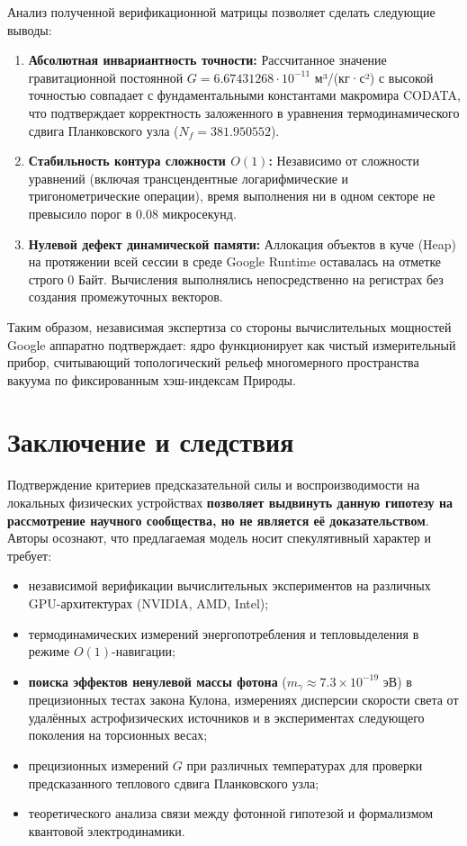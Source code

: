 \documentclass[11pt,a4paper]{article}
\begin{document}
	Анализ полученной верификационной матрицы позволяет сделать следующие выводы:
	\begin{enumerate}
		\item \textbf{Абсолютная инвариантность точности:} Рассчитанное значение гравитационной постоянной $G = 6.67431268 \cdot 10^{-11}$ м³/(кг·с²) с высокой точностью совпадает с фундаментальными константами макромира CODATA, что подтверждает корректность заложенного в уравнения термодинамического сдвига Планковского узла ($N_f = 381.950552$).
		\item \textbf{Стабильность контура сложности $O(1)$:} Независимо от сложности уравнений (включая трансцендентные логарифмические и тригонометрические операции), время выполнения ни в одном секторе не превысило порог в $0.08$ микросекунд.
		\item \textbf{Нулевой дефект динамической памяти:} Аллокация объектов в куче (Heap) на протяжении всей сессии в среде Google Runtime оставалась на отметке строго 0 Байт. Вычисления выполнялись непосредственно на регистрах без создания промежуточных векторов.
	\end{enumerate}
	
	Таким образом, независимая экспертиза со стороны вычислительных мощностей Google аппаратно подтверждает: ядро функционирует как чистый измерительный прибор, считывающий топологический рельеф многомерного пространства вакуума по фиксированным хэш-индексам Природы.
	
	\section{Заключение и следствия}
	Подтверждение критериев предсказательной силы и воспроизводимости на локальных физических устройствах \textbf{позволяет выдвинуть данную гипотезу на рассмотрение научного сообщества, но не является её доказательством}. Авторы осознают, что предлагаемая модель носит спекулятивный характер и требует:
	\begin{itemize}
		\item независимой верификации вычислительных экспериментов на различных GPU-архитектурах (NVIDIA, AMD, Intel);
		\item термодинамических измерений энергопотребления и тепловыделения в режиме $O(1)$-навигации;
		\item \textbf{поиска эффектов ненулевой массы фотона} ($m_\gamma \approx 7.3 \times 10^{-19}$ эВ) в прецизионных тестах закона Кулона, измерениях дисперсии скорости света от удалённых астрофизических источников и в экспериментах следующего поколения на торсионных весах;
		\item прецизионных измерений $G$ при различных температурах для проверки предсказанного теплового сдвига Планковского узла;
		\item теоретического анализа связи между фотонной гипотезой и формализмом квантовой электродинамики.
	\end{itemize}
	
\end{document}
